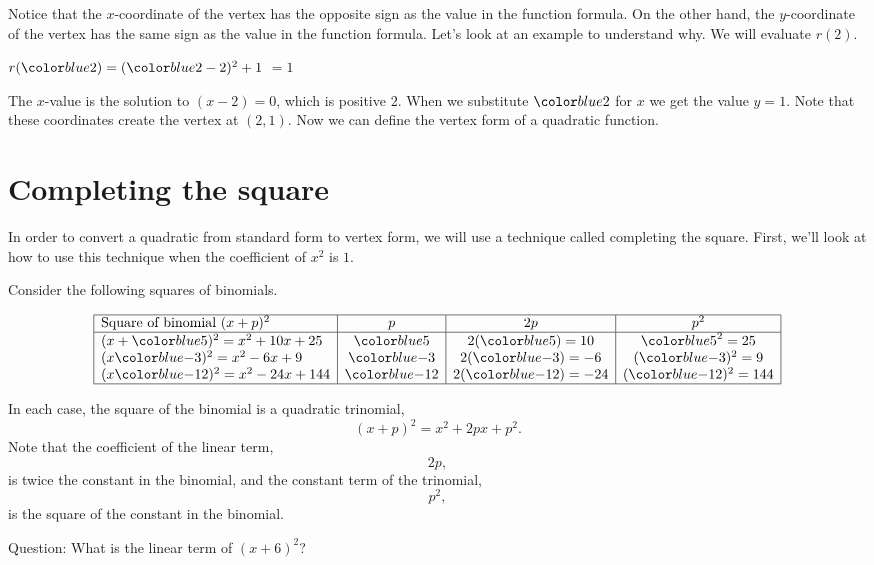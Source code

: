 \documentclass{ximera}
\begin{document}
      Notice that the $x$-coordinate of the vertex has the opposite sign as the value in the function formula.
      On the other hand,
      the $y$-coordinate of the vertex has the same sign as the value in the function formula.
      Let's look at an example to understand why.
      We will evaluate $r(2)$.

        $r(\substitute{2})=(\substitute{2}-2)^2+1$
        $=1$

      The $x$-value is the solution to $(x-2)=0$,
      which is positive $2$.
      When we substitute $\substitute{2}$ for $x$ we get the value $y=1$.
      Note that these coordinates create the vertex at $(2,1)$.
      Now we can define the vertex form of a quadratic function.

\section{Completing the square}

In order to convert a quadratic from standard form to vertex form, we will use a technique called completing the square. First, we'll look at how to use this technique when the coefficient of $x^2$ is $1$.


Consider the following squares of binomials.


\[
 \begin{array}{|l|c|c|c|}
 \hline
 \text{Square of binomial } (x+p)^2 & p & 2p & p^2\\
 \hline
 (x+\substitute{5})^2 = x^2 + 10x + 25 & \substitute{5} & 2(\substitute{5}) = 10 & \substitute{5}^2 = 25 \\
 (x\substitute{-3})^2 = x^2 - 6x + 9 & \substitute{-3} & 2(\substitute{-3}) = -6 & (\substitute{-3})^2 = 9 \\
 (x\substitute{-12})^2 = x^2 -24 x + 144 & \substitute{-12} & 2(\substitute{-12}) = -24 & (\substitute{-12})^2 = 144 \\
 \hline
\end{array}
\]

In each case, the square of the binomial is a quadratic trinomial,
$$
    (x+p)^2 = x^2 + 2px + p^2.
$$
Note that the coefficient of the linear term, 
$$
    2p,
$$
is twice the constant in the binomial, and the constant term of the trinomial, 
$$
    p^2,
$$
is the square of the constant in the binomial.
   
\begin{question}  
Question: What is the linear term of $(x+6)^2$? 
\begin{multipleChoice}  
\end{multipleChoice}  
\end{question}
\end{document}
